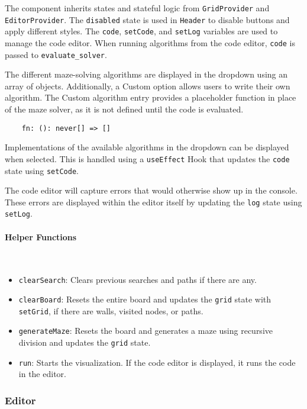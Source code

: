 The component inherits states and stateful logic from \texttt{GridProvider} and \texttt{EditorProvider}. The \texttt{disabled} state is used in \texttt{Header} to disable buttons and apply different styles. The \texttt{code}, \texttt{setCode}, and \texttt{setLog} variables are used to manage the code editor. When running algorithms from the code editor, \texttt{code} is passed to \texttt{evaluate\_solver}.

The different maze-solving algorithms are displayed in the dropdown using an array of objects. Additionally, a Custom option allows users to write their own algorithm. The Custom algorithm entry provides a placeholder function in place of the maze solver, as it is not defined until the code is evaluated.

\begin{verbatim}
    fn: (): never[] => []
\end{verbatim}


Implementations of the available algorithms in the dropdown can be displayed when selected. This is handled using a \texttt{useEffect} Hook that updates the \texttt{code} state using \texttt{setCode}.

The code editor will capture errors that would otherwise show up in the console. These errors are displayed within the editor itself by updating the \texttt{log} state using \texttt{setLog}.

\paragraph{Helper Functions} \

\begin{itemize}
    \item \texttt{clearSearch}: Clears previous searches and paths if there are any.
    \item \texttt{clearBoard}: Resets the entire board and updates the \texttt{grid} state with \texttt{setGrid}, if there are walls, visited nodes, or paths.
    \item \texttt{generateMaze}: Resets the board and generates a maze using recursive division and updates the \texttt{grid} state.
    \item \texttt{run}: Starts the visualization. If the code editor is displayed, it runs the code in the editor.
\end{itemize}

\subsubsection{Editor}

